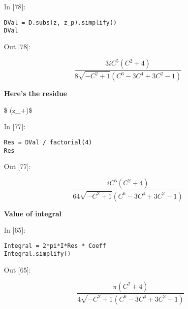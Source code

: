 \documentclass[11pt]{article}
\newif\ifcode
\newif\ifleftmargins
\newlength{\promptlength}
\newcommand{\prompt}[3]{
        \needspace{1.1cm}
        \settowidth{\promptlength}{ #1 [#3] }
        \ifleftmargins\hspace{-\promptlength}\hspace{-5pt}\fi
        {\color{#2}#1 [#3]:}
        \ifleftmargins\vspace{-2.7ex}\fi
    }
\renewcommand{\paragraph}{\textbf}
\begin{document}
    
\prompt{In}{incolor}{78}
\codetrue
\begin{tcolorbox}[breakable, size=fbox, boxrule=1pt, pad at break*=1mm, colback=cellbackground, colframe=cellborder]
\begin{verbatim}
DVal = D.subs(z, z_p).simplify()
DVal
\end{verbatim}
\end{tcolorbox}
\codefalse
 
            
\prompt{Out}{outcolor}{78}
    
    $$\frac{3 i C^{5} \left(C^{2} + 4\right)}{8 \sqrt{- C^{2} + 1} \left(C^{6} - 3 C^{4} + 3 C^{2} - 1\right)}$$

    

    \hypertarget{heres-the-residue}{%
\paragraph{Here's the residue}\label{heres-the-residue}}

\$   \Phi(z\_+)\$

    
\prompt{In}{incolor}{77}
\codetrue
\begin{tcolorbox}[breakable, size=fbox, boxrule=1pt, pad at break*=1mm, colback=cellbackground, colframe=cellborder]
\begin{verbatim}
Res = DVal / factorial(4)
Res
\end{verbatim}
\end{tcolorbox}
\codefalse
 
            
\prompt{Out}{outcolor}{77}
    
    $$\frac{i C^{5} \left(C^{2} + 4\right)}{64 \sqrt{- C^{2} + 1} \left(C^{6} - 3 C^{4} + 3 C^{2} - 1\right)}$$

    

    \hypertarget{value-of-integral}{%
\paragraph{Value of integral}\label{value-of-integral}}

    
\prompt{In}{incolor}{65}
\codetrue
\begin{tcolorbox}[breakable, size=fbox, boxrule=1pt, pad at break*=1mm, colback=cellbackground, colframe=cellborder]
\begin{verbatim}
Integral = 2*pi*I*Res * Coeff
Integral.simplify()
\end{verbatim}
\end{tcolorbox}
\codefalse
 
            
\prompt{Out}{outcolor}{65}
    
    $$- \frac{\pi \left(C^{2} + 4\right)}{4 \sqrt{- C^{2} + 1} \left(C^{6} - 3 C^{4} + 3 C^{2} - 1\right)}$$

    


    
    
    
    
\end{document}

